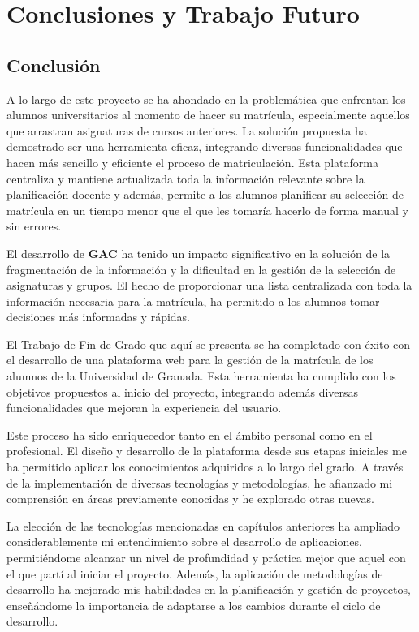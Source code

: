 \chapter{Conclusiones y Trabajo Futuro}

\section{Conclusión}

A lo largo de este proyecto se ha ahondado en la problemática que enfrentan los alumnos universitarios al momento de hacer su matrícula, especialmente aquellos que arrastran asignaturas de cursos anteriores. La solución propuesta ha demostrado ser una herramienta eficaz, integrando diversas funcionalidades que hacen más sencillo y eficiente el proceso de matriculación. Esta plataforma centraliza y mantiene actualizada toda la información relevante sobre la planificación docente y además, permite a los alumnos planificar su selección de matrícula en un tiempo menor que el que les tomaría hacerlo de forma manual y sin errores.\newline

El desarrollo de \textbf{GAC} ha tenido un impacto significativo en la solución de la fragmentación de la información y la dificultad en la gestión de la selección de asignaturas y grupos. El hecho de proporcionar una lista centralizada con toda la información necesaria para la matrícula, ha permitido a los alumnos tomar decisiones más informadas y rápidas.\newline

El Trabajo de Fin de Grado que aquí se presenta se ha completado con éxito con el desarrollo de una plataforma web para la gestión de la matrícula de los alumnos de la Universidad de Granada. Esta herramienta ha cumplido con los objetivos propuestos al inicio del proyecto, integrando además diversas funcionalidades que mejoran la experiencia del usuario.\newline

Este proceso ha sido enriquecedor tanto en el ámbito personal como en el profesional. El diseño y desarrollo de la plataforma desde sus etapas iniciales me ha permitido aplicar los conocimientos adquiridos a lo largo del grado. A través de la implementación de diversas tecnologías y metodologías, he afianzado mi comprensión en áreas previamente conocidas y he explorado otras nuevas.\newline

La elección de las tecnologías mencionadas en capítulos anteriores ha ampliado considerablemente mi entendimiento sobre el desarrollo de aplicaciones, permitiéndome alcanzar un nivel de profundidad y práctica mejor que aquel con el que partí al iniciar el proyecto. Además, la aplicación de metodologías de desarrollo ha mejorado mis habilidades en la planificación y gestión de proyectos, enseñándome la importancia de adaptarse a los cambios durante el ciclo de desarrollo.\newline

